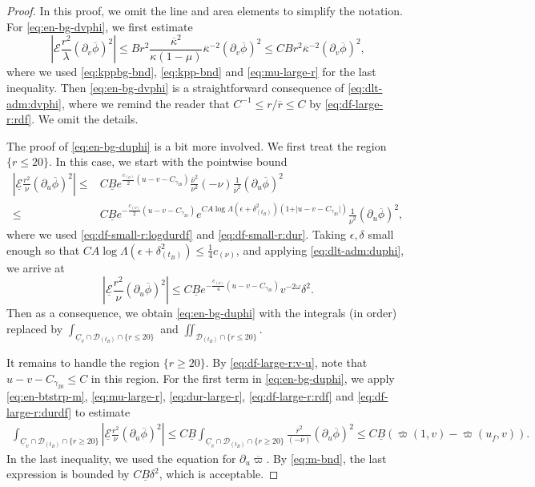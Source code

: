 \documentclass[10pt, reqno]{amsart}
\theoremstyle{definition}
\theoremstyle{remark}
\theoremstyle{conjecture}
\numberwithin{equation}{section}
\newcommand{\abs}[1]{\vert#1\vert}
\newcommand{\set}[1]{\{#1\}}
\newcommand{\rd}{\partial}
\newcommand{\0}{\emptyset}
\newcommand{\gmm}{\gamma}
\newcommand{\dlt}{\delta}
\newcommand{\eps}{\epsilon}
\newcommand{\kpp}{\kappa}
\newcommand{\lmb}{\lambda}
\newcommand{\Lmb}{\Lambda}
\newcommand{\omg}{\omega}
\newcommand{\calD}{\mathcal D}
\newcommand{\calE}{\mathcal E}
\newcommand{\uC}{\underline{C}}
\newcommand{\dur}{\nu}
\newcommand{\dvr}{\lmb}
\newcommand{\phibg}{\overline{\phi}}				%
\newcommand{\durbg}{\overline{\dur}}				%
\newcommand{\rbg}{\overline{r}}					%
\newcommand{\varpibg}{\overline{\varpi}}				%
\newcommand{\kppbg}{\overline{\kpp}}					%
\newcommand{\Abs}[1]{\left\vert #1 \right\vert}
\begin{document}
\begin{proof}
In this proof, we omit the line and area elements to simplify the notation. For \eqref{eq:en-bg-dvphi}, we first estimate
\begin{equation*}
\Abs{\calE \frac{r^{2}}{\dvr} (\rd_{v} \phibg)^{2}}
\leq B r^{2} \frac{\kppbg^{2}}{\kpp (1-\mu) } \kppbg^{-2} (\rd_{v} \phibg)^{2}
\leq C B r^{2} \kppbg^{-2} (\rd_{v} \phibg)^{2},
\end{equation*}
where we used \eqref{eq:kppbg-bnd}, \eqref{eq:kpp-bnd} and \eqref{eq:mu-large-r} for the last inequality. Then \eqref{eq:en-bg-dvphi} is a straightforward consequence of \eqref{eq:dlt-adm:dvphi}, where we remind the reader that $C^{-1} \leq r/\rbg \leq C$ by \eqref{eq:df-large-r:rdf}.
We omit the details.

The proof of \eqref{eq:en-bg-duphi} is a bit more involved. We first treat the region $\set{r \leq 20}$. 
In this case, we start with the pointwise bound
\begin{align*}
	\Abs{\underline{\calE} \frac{r^{2}}{\dur} (\rd_{u} \phibg)^{2}}
	\leq & C \underline{B} e^{\frac{c_{(\dur)}}{2} (u - v - C_{\gmm_{20}})}\frac{\durbg^{2}}{\dur^{2}} (-\dur) \frac{1}{\durbg^{2}}(\rd_{u} \phibg)^{2} \\
	\leq & C \underline{B} e^{- \frac{c_{(\dur)}}{2} (u - v - C_{\gmm_{20}})} e^{C A \log \Lmb (\eps + \dlt_{(t_{B})}^{2}) (1 + \abs{u - v - C_{\gmm_{20}}})} \frac{1}{\durbg^{2}}(\rd_{u} \phibg)^{2},
\end{align*}
where we used \eqref{eq:df-small-r:logdurdf} and \eqref{eq:df-small-r:dur}.
Taking $\eps, \dlt$ small enough so that $C A \log \Lmb (\eps + \dlt_{(t_{B})}^{2}) \leq \frac{1}{4} c_{(\dur)}$, and applying \eqref{eq:dlt-adm:duphi}, we arrive at
\begin{equation*}
\Abs{\underline{\calE} \frac{r^{2}}{\dur} (\rd_{u} \phibg)^{2}}
\leq C \underline{B} e^{- \frac{c_{(\dur)}}{4} (u - v - C_{\gmm_{20}})} v^{-2 \omg} \dlt^{2}.
\end{equation*}
Then as a consequence, we obtain \eqref{eq:en-bg-duphi} with the integrals (in order) replaced by $\int_{\uC_{v} \cap \calD_{(t_{B})} \cap \set{r \leq 20}}$ and $\iint_{\calD_{(t_{B})} \cap \set{r \leq 20}}$.

It remains to handle the region $\set{r \geq 20}$. By \eqref{eq:df-large-r:v-u}, note that $u - v - C_{\gmm_{20}} \leq C$ in this region. For the first term in \eqref{eq:en-bg-duphi}, we apply \eqref{eq:en-btstrp-m}, \eqref{eq:mu-large-r}, \eqref{eq:dur-large-r},  \eqref{eq:df-large-r:rdf} and \eqref{eq:df-large-r:durdf} to estimate
\begin{align*}
\int_{\uC_{v} \cap \calD_{(t_{B})} \cap \set{r \geq 20}} 
	\Abs{ \underline{\calE} \frac{r^{2}}{\dur}(\rd_{u} \phibg)^{2}} 
\leq C \underline{B} \int_{\uC_{v} \cap \calD_{(t_{B})} \cap \set{r \geq 20}} 
	\frac{\rbg^{2}}{(-\durbg)}(\rd_{u} \phibg)^{2} 
\leq C \underline{B} (\varpibg(1, v) - \varpibg(u_{f}, v)).
\end{align*}
In the last inequality, we used the equation for $\rd_{u} \varpibg$. By \eqref{eq:m-bnd}, the last expression is bounded by $C \underline{B} \dlt^{2}$, which is acceptable.


\end{proof}
\end{document}
